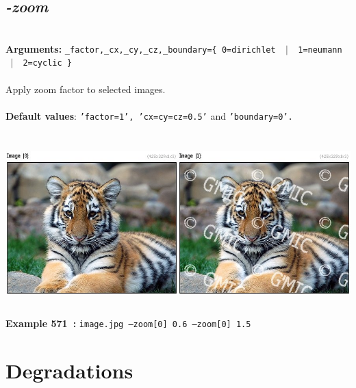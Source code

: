 \documentclass[a4paper,11pt,twoside]{book}
\begin{document}
\subsection{\emph{-zoom} }\vspace*{-0.5em}
~\\\textbf{Arguments: } 
{\small \texttt{\_factor,\_cx,\_cy,\_cz,\_boundary=\{ 0=dirichlet ~$|$~ 1=neumann ~$|$~ 2=cyclic \}}}\\~\\
Apply zoom factor to selected images.
~\\~\\\textbf{Default values}: {\small \texttt{'factor=1', 'cx=cy=cz=0.5'} and \texttt{'boundary=0'.}}
\begin{center}\includegraphics[keepaspectratio=true,height=7cm,width=\textwidth]{img/gmic_def571.jpg}\\
{\footnotesize \textbf{Example 571~:} \texttt{image.jpg --zoom[0] 0.6 --zoom[0] 1.5}}
\end{center}
\section{Degradations}
\end{document}

